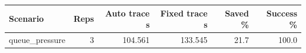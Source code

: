 \begin{tabular}{lrrrrr}
\hline
Scenario & Reps & Auto trace s & Fixed trace s & Saved \% & Success \% \\
\hline
queue_pressure & 3 & 104.561 & 133.545 & 21.7 & 100.0 \\
\hline
\end{tabular}
